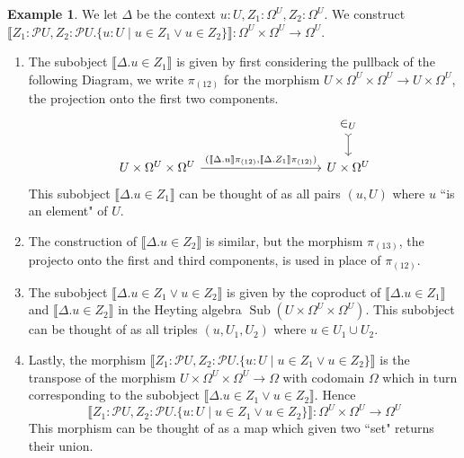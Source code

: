 \documentclass{birkjour}
\theoremstyle{plain}
\theoremstyle{definition}
\newtheorem{example}[thm]{Example}
\newcommand{\call}[1]{\mathcal{#1}}
\newcommand{\lto}{\longrightarrow}
\begin{document}
	\begin{example}\label{ex:union}
		We let $\Delta$ be the context $u:U, Z_1:\Omega^U, Z_2: \Omega^U$. We construct $\llbracket Z_1:\call{P}U, Z_2:\call{P}U. \lbrace u : U \mid u \in Z_1 \vee u \in Z_2 \rbrace \rrbracket : \Omega^U \times \Omega^U \lto \Omega^U$.
		\begin{enumerate}
			\item The subobject $\llbracket \Delta . u \in Z_1 \rrbracket$ is given by first considering the pullback of the following Diagram, we write $\pi_{(12)}$ for the morphism $U \times \Omega^U \times \Omega^U \lto U \times \Omega^U$, the projection onto the first two components.
			\begin{equation}
				\begin{tikzcd}[column sep = huge]
					& & \in_U\arrow[d, rightarrowtail]\\
					U \times \Omega^U \times \Omega^U\arrow[rr,"{(\llbracket \Delta. u\rrbracket\pi_{(12)}, \llbracket \Delta. Z_1 \rrbracket\pi_{(12)})}"] & & U \times \Omega^U
				\end{tikzcd}
			\end{equation}
			This subobject $\llbracket \Delta. u \in Z_1\rrbracket$ can be thought of as all pairs $(u, U)$ where $u$ ``is an element" of $U$.
			\item The construction of $\llbracket \Delta. u \in Z_2\rrbracket$ is similar, but the morphism $\pi_{(13)}$, the projecto onto the first and third components, is used in place of $\pi_{(12)}$.
			\item The subobject $\llbracket \Delta. u \in Z_1 \vee u \in Z_2\rrbracket$ is given by the coproduct of $\llbracket \Delta. u \in Z_1 \rrbracket$ and $\llbracket \Delta. u \in Z_2 \rrbracket$ in the Heyting algebra $\operatorname{Sub}(U \times \Omega^U \times \Omega^U)$. This subobject can be thought of as all triples $(u,U_1,U_2)$ where $u \in U_1 \cup U_2$.
			\item Lastly, the morphism $\llbracket Z_1:\call{P}U, Z_2:\call{P}U. \lbrace u:U \mid u \in Z_1 \vee u \in Z_2 \rbrace \rrbracket$ is the transpose of the morphism $U \times \Omega^U \times \Omega^U \lto \Omega$ with codomain $\Omega$ which in turn corresponding to the subobject $\llbracket \Delta. u \in Z_1 \vee u \in Z_2 \rrbracket$. Hence
			\begin{equation}
				\llbracket Z_1:\call{P}U, Z_2:\call{P}U. \lbrace u : U \mid u \in Z_1 \vee u \in Z_2 \rbrace \rrbracket : \Omega^U \times \Omega^U \lto \Omega^U
			\end{equation}
			This morphism can be thought of as a map which given two ``set" returns their union.
		\end{enumerate}
	\end{example}
\end{document}
